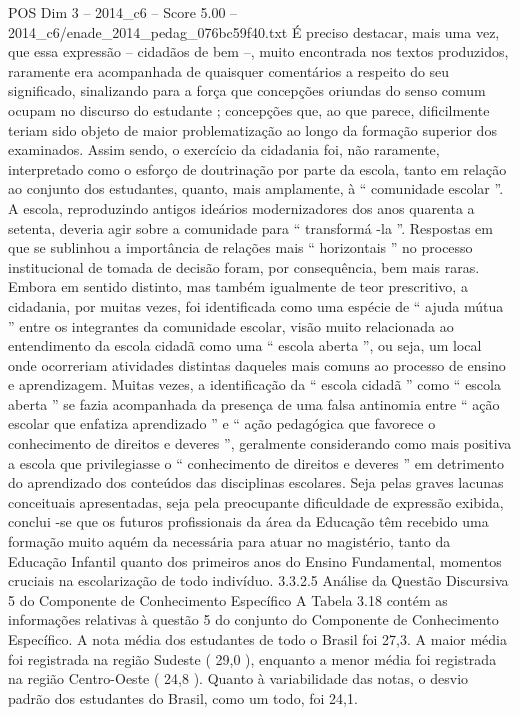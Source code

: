 \begin{textsample}{POS Dim 3 – 2014\_c6 – Score 5.00 – 2014\_c6/enade\_2014\_pedag\_076bc59f40.txt}
É preciso destacar, mais uma vez, que essa expressão – cidadãos de bem –, muito encontrada nos textos produzidos, raramente era acompanhada de quaisquer comentários a respeito do seu significado, sinalizando para a força que concepções oriundas do senso comum ocupam no discurso do estudante ; concepções que, ao que parece, dificilmente teriam sido objeto de maior problematização ao longo da formação superior dos examinados.
Assim sendo, o exercício da cidadania foi, não raramente, interpretado como o esforço de doutrinação por parte da escola, tanto em relação ao conjunto dos estudantes, quanto, mais amplamente, à “ comunidade escolar ”.
A escola, reproduzindo antigos ideários modernizadores dos anos quarenta a setenta, deveria agir sobre a comunidade para “ transformá -la ”.
Respostas em que se sublinhou a importância de relações mais “ horizontais ” no processo institucional de tomada de decisão foram, por consequência, bem mais raras.
Embora em sentido distinto, mas também igualmente de teor prescritivo, a cidadania, por muitas vezes, foi identificada como uma espécie de “ ajuda mútua ” entre os integrantes da comunidade escolar, visão muito relacionada ao entendimento da escola cidadã como uma “ escola aberta ”, ou seja, um local onde ocorreriam atividades distintas daqueles mais comuns ao processo de ensino e aprendizagem.
Muitas vezes, a identificação da “ escola cidadã ” como “ escola aberta ” se fazia acompanhada da presença de uma falsa antinomia entre “ ação escolar que enfatiza aprendizado ” e “ ação pedagógica que favorece o conhecimento de direitos e deveres ”, geralmente considerando como mais positiva a escola que privilegiasse o “ conhecimento de direitos e deveres ” em detrimento do aprendizado dos conteúdos das disciplinas escolares.
Seja pelas graves lacunas conceituais apresentadas, seja pela preocupante dificuldade de expressão exibida, conclui -se que os futuros profissionais da área da Educação têm recebido uma formação muito aquém da necessária para atuar no magistério, tanto da Educação Infantil quanto dos primeiros anos do Ensino Fundamental, momentos cruciais na escolarização de todo indivíduo. 3.3.2.5 Análise da Questão Discursiva 5 do Componente de Conhecimento Específico A Tabela 3.18 contém as informações relativas à questão 5 do conjunto do Componente de Conhecimento Específico.
A nota média dos estudantes de todo o Brasil foi 27,3.
A maior média foi registrada na região Sudeste ( 29,0 ), enquanto a menor média foi registrada na região Centro-Oeste ( 24,8 ).
Quanto à variabilidade das notas, o desvio padrão dos estudantes do Brasil, como um todo, foi 24,1.

\end{textsample}
